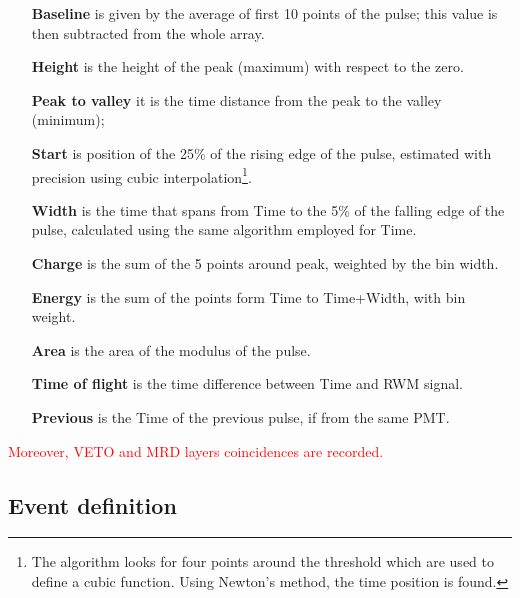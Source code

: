 \begin{itemize}
  \item[\bfseries Baseline] is given by the average of first 10 points of the pulse; %
    this value is then subtracted from the whole array.
  \item[\bfseries Height] is the height of the peak (maximum) with respect to the zero.
  \item[\bfseries Peak to valley] it is the time distance from the peak to the valley (minimum);
  \item[\bfseries Start] is position of the 25\% of the rising edge of the pulse, estimated with %
    precision using cubic interpolation\footnote{The algorithm looks for four points around the %
    threshold which are used to define a cubic function. Using Newton's method, the time position %
    is found.}.
  \item[\bfseries Width] is the time that spans from Time to the 5\% of the falling edge %
    of the pulse, calculated using the same algorithm employed for Time.
  \item[\bfseries Charge] is the sum of the 5 points around peak, weighted by the bin width.
  \item[\bfseries Energy] is the sum of the points form Time to Time+Width, with bin weight.
  \item[\bfseries Area] is the area of the modulus of the pulse.
  \item[\bfseries Time of flight] is the time difference between Time and RWM signal.
  \item[\bfseries Previous] is the Time of the previous pulse, if from the same PMT.
\end{itemize}

\textcolor{red}{Moreover, VETO and MRD layers coincidences are recorded.}

\subsection{Event definition}

